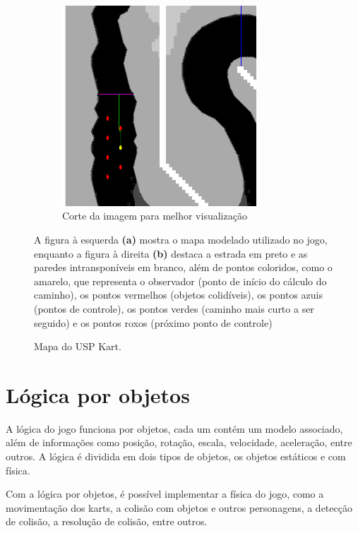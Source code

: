 \begin{figure}[H]
\begin{subfigure}[t]{0.45\textwidth}
        \includegraphics[width=0.8\textwidth]{figuras/Mapa modelado cortado.png}
        \caption{Corte da imagem para melhor visualização}
        \label{fig:mapa-modelado-com-pontos}
    \end{subfigure}
    \caption{Mapa do USP Kart.}
    \footnotesize{A figura à esquerda \textbf{(a)} mostra o mapa modelado utilizado no jogo, enquanto a figura à direita \textbf{(b)} destaca a estrada em preto e as paredes intransponíveis em branco, além de pontos coloridos, como o amarelo, que representa o observador (ponto de início do cálculo do caminho), os pontos vermelhos (objetos colidíveis), os pontos azuis (pontos de controle), os pontos verdes (caminho mais curto a ser seguido) e os pontos roxos (próximo ponto de controle)}
    \label{fig:mapa-usp-kart}
\end{figure}

\section{Lógica por objetos}

A lógica do jogo funciona por objetos, cada um contém um modelo associado, além de informações como posição, rotação, escala, velocidade, aceleração, entre outros. A lógica é dividida em dois tipos de objetos, os objetos estáticos e com física.

Com a lógica por objetos, é possível implementar a física do jogo, como a movimentação dos karts, a colisão com objetos e outros personagens, a detecção de colisão, a resolução de colisão, entre outros.

